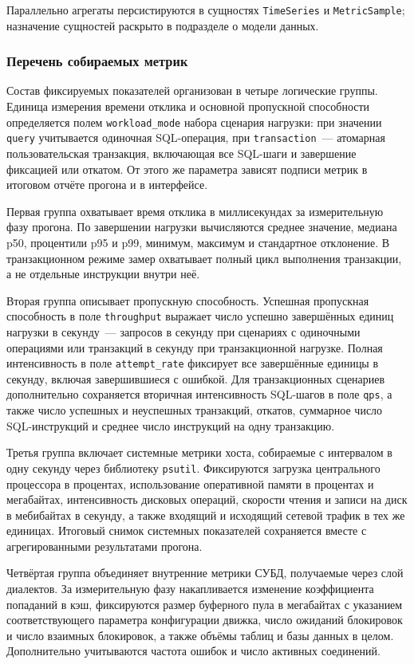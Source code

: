 Параллельно агрегаты персистируются в сущностях \texttt{TimeSeries} и \texttt{MetricSample}; назначение сущностей раскрыто в подразделе о модели данных.

\subsubsection{Перечень собираемых метрик}

Состав фиксируемых показателей организован в четыре логические группы. Единица измерения времени отклика и основной пропускной способности определяется полем \texttt{workload\_mode} набора сценария нагрузки: при значении \texttt{query} учитывается одиночная SQL-операция, при \texttt{transaction}~--- атомарная пользовательская транзакция, включающая все SQL-шаги и завершение фиксацией или откатом. От этого же параметра зависят подписи метрик в итоговом отчёте прогона и в интерфейсе.

Первая группа охватывает время отклика в миллисекундах за измерительную фазу прогона. По завершении нагрузки вычисляются среднее значение, медиана p50, процентили p95 и p99, минимум, максимум и стандартное отклонение. В транзакционном режиме замер охватывает полный цикл выполнения транзакции, а не отдельные инструкции внутри неё.

Вторая группа описывает пропускную способность. Успешная пропускная способность в поле \texttt{throughput} выражает число успешно завершённых единиц нагрузки в секунду~--- запросов в секунду при сценариях с одиночными операциями или транзакций в секунду при транзакционной нагрузке. Полная интенсивность в поле \texttt{attempt\_rate} фиксирует все завершённые единицы в секунду, включая завершившиеся с ошибкой. Для транзакционных сценариев дополнительно сохраняется вторичная интенсивность SQL-шагов в поле \texttt{qps}, а также число успешных и неуспешных транзакций, откатов, суммарное число SQL-инструкций и среднее число инструкций на одну транзакцию.

Третья группа включает системные метрики хоста, собираемые с интервалом в одну секунду через библиотеку \texttt{psutil}. Фиксируются загрузка центрального процессора в процентах, использование оперативной памяти в процентах и мегабайтах, интенсивность дисковых операций, скорости чтения и записи на диск в мебибайтах в секунду, а также входящий и исходящий сетевой трафик в тех же единицах. Итоговый снимок системных показателей сохраняется вместе с агрегированными результатами прогона.

Четвёртая группа объединяет внутренние метрики СУБД, получаемые через слой диалектов. За измерительную фазу накапливается изменение коэффициента попаданий в кэш, фиксируются размер буферного пула в мегабайтах с указанием соответствующего параметра конфигурации движка, число ожиданий блокировок и число взаимных блокировок, а также объёмы таблиц и базы данных в целом. Дополнительно учитываются частота ошибок и число активных соединений.

